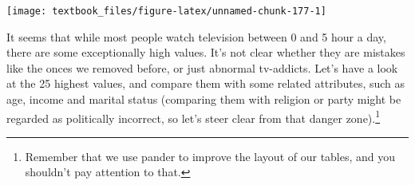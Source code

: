\documentclass[]{tufte-book}
\newenvironment{Shaded}{}{}
\newcommand{\DecValTok}[1]{\textcolor[rgb]{0.25,0.63,0.44}{#1}}
\newcommand{\KeywordTok}[1]{\textcolor[rgb]{0.00,0.44,0.13}{\textbf{#1}}}
\newcommand{\NormalTok}[1]{#1}
\newcommand{\OperatorTok}[1]{\textcolor[rgb]{0.40,0.40,0.40}{#1}}
\newcommand{\StringTok}[1]{\textcolor[rgb]{0.25,0.44,0.63}{#1}}
\begin{document}
\texttt{[image: textbook\_files/figure-latex/unnamed-chunk-177-1]}

It seems that while most people watch television between 0 and 5 hour a day, there are some exceptionally high values. It's not clear whether they are mistakes like the onces we removed before, or just abnormal tv-addicts. Let's have a look at the 25 highest values, and compare them with some related attributes, such as age, income and marital status (comparing them with religion or party might be regarded as politically incorrect, so let's steer clear from that danger zone).\footnote{Remember that we use pander to improve the layout of our tables, and you shouldn't pay attention to that.}

\begin{Shaded}
\end{Shaded}
\end{document}
